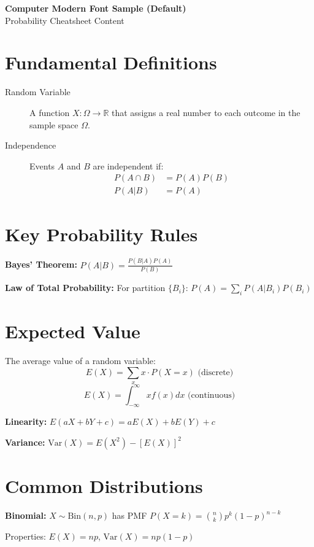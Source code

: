 \documentclass[10pt]{article}
\newcommand{\var}{\textrm{Var}}
\newcommand{\Bin}{\textrm{Bin}}
\begin{document}
\begin{center}
{\Large\bfseries Computer Modern Font Sample (Default)}\\
{\large Probability Cheatsheet Content}
\end{center}

\vspace{0.5cm}

\section{Fundamental Definitions}
\begin{description}
    \item[Random Variable] A function $X: \Omega \to \mathbb{R}$ that assigns a real number to each outcome in the sample space $\Omega$.
    \item[Independence] Events $A$ and $B$ are independent if:
    \begin{align*}
        P(A \cap B) &= P(A)P(B) \\
        P(A|B) &= P(A)
    \end{align*}
\end{description}

\section{Key Probability Rules}
\textbf{Bayes' Theorem:} $P(A|B) = \frac{P(B|A)P(A)}{P(B)}$

\textbf{Law of Total Probability:} For partition $\{B_i\}$: $P(A) = \sum_{i} P(A|B_i)P(B_i)$

\section{Expected Value}
The average value of a random variable:
\[E(X) = \sum_{x} x \cdot P(X = x) \text{ (discrete)}\]
\[E(X) = \int_{-\infty}^{\infty} x f(x) dx \text{ (continuous)}\]

\textbf{Linearity:} $E(aX + bY + c) = aE(X) + bE(Y) + c$

\textbf{Variance:} $\var(X) = E(X^2) - [E(X)]^2$

\section{Common Distributions}
\textbf{Binomial:} $X \sim \Bin(n, p)$ has PMF $P(X = k) = \binom{n}{k} p^k (1-p)^{n-k}$

Properties: $E(X) = np$, $\var(X) = np(1-p)$
\end{document}

